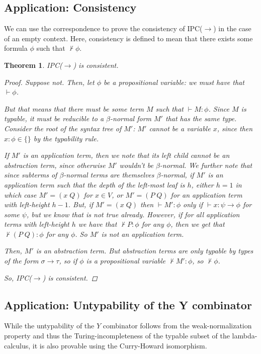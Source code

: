 \documentclass[12pt]{article}
\newtheorem{theorem}{Theorem}
\begin{document}
\subsection{Application: Consistency}
We can use the correspondence to prove the consistency of IPC($\to$) in the case of an empty context.
Here, consistency is defined to mean that there exists some formula $\phi$ such that $\not\vdash\phi$. 
\begin{theorem}
IPC($\to$) is consistent. 
\begin{proof}
Suppose not. Then, let $\phi$ be a propositional variable: we must have that $\vdash\phi$. 

But that means that there must be some term $M$ such that $\vdash M\colon\phi$. 
Since $M$ is typable, it must be reducible to a $\beta$-normal form $M'$ that has the same type. 
Consider the root of the syntax tree of $M'$:
$M'$ cannot be a variable $x$, since then $x\colon\phi\in\{\}$ by the typability rule. 

If $M'$ is an application term, then we note that its left child cannot be an abstraction term, 
since otherwise $M'$ wouldn't be $\beta$-normal. 
We further note that since subterms of $\beta$-normal terms are themselves $\beta$-normal,
if $M'$ is an application term such that the depth of the left-most leaf is $h$, 
either $h=1$ in which case $M' = (x\; Q)$ for $x\in V$,
or $M' = (P\; Q)$ for an application term with left-height $h-1$. 
But, if $M'=(x\; Q)$ then $\vdash M':\phi$ only if $\vdash x :\psi\to\phi$ for some $\psi$, 
but we know that is not true already.
However, if for all application terms with left-height $h$ we have that $\not\vdash P:\phi$
for any $\phi$, then we get that $\not\vdash (P \; Q) :\phi$ for any $\phi$. 
So $M'$ is not an application term. 

Then, $M'$ is an abstraction term. But abstraction terms are only typable by types of the form $\sigma\to\tau$,
so if $\phi$ is a propositional variable $\not\vdash M' \colon\phi$, so $\not\vdash \phi$. 

So, IPC($\to$) is consistent.
\end{proof}
\end{theorem}
\subsection{Application: Untypability of the Y combinator}
While the untypability of the $Y$ combinator follows from the weak-normalization property
and thus the Turing-incompleteness of the typable subset of the lambda-calculus,
it is also provable using the Curry-Howard isomorphism. 
\end{document}

